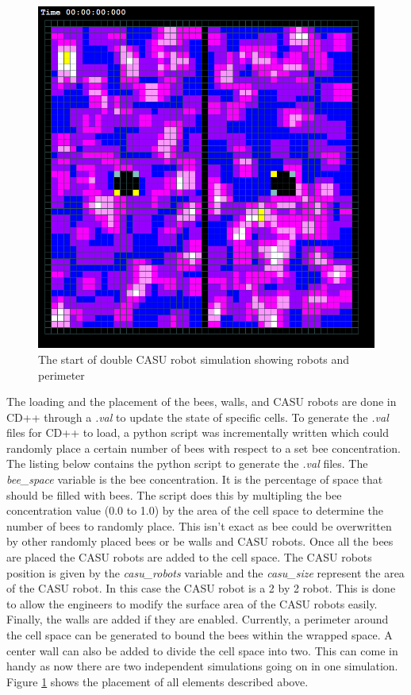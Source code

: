 \documentclass[conference,compsoc,onecolumn]{IEEEtran}
\begin{document}
\begin{figure}[htbp]
	\centerline{\includegraphics[scale=0.85]{../images/hive-15per-00-00-00.PNG}}
	\caption{The start of double CASU robot simulation showing robots and perimeter}
	\label{perimeter}
\end{figure}

The loading and the placement of the bees, walls, and CASU robots are done in CD++ through a \emph{.val} to update the state of specific cells. To generate the \emph{.val} files for CD++ to load, a python script was incrementally written which could randomly place a certain number of bees with respect to a set bee concentration. The listing below contains the python script to generate the \emph{.val} files. The \emph{bee\_space} variable is the bee concentration. It is the percentage of space that should be filled with bees. The script does this by multipling the bee concentration value (0.0 to 1.0) by the area of the cell space to determine the number of bees to randomly place. This isn't exact as bee could be overwritten by other randomly placed bees or be walls and CASU robots. Once all the bees are placed the CASU robots are added to the cell space. The CASU robots position is given by the \emph{casu\_robots} variable and the \emph{casu\_size} represent the area of the CASU robot. In this case the CASU robot is a 2 by 2 robot. This is done to allow the engineers to modify the surface area of the CASU robots easily. Finally, the walls are added if they are enabled. Currently, a perimeter around the cell space can be generated to bound the bees within the wrapped space. A center wall can also be added to divide the cell space into two. This can come in handy as now there are two independent simulations going on in one simulation. Figure \ref{perimeter} shows the placement of all elements described above.
\end{document}
